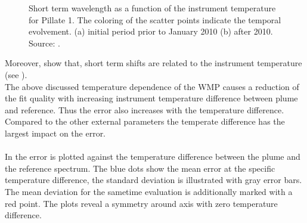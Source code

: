 \begin{figure}		
	\caption{Short term wavelength as a function of the instrument temperature for Pillate 1. The coloring of the scatter points indicate the temporal evolvement. (a) initial period prior to January 2010 (b) after 2010. Source: \cite{WarnachSimon}.}
	\label{fig:shorttermshift}
\end{figure}
Moreover, \cite{WarnachSimon} show that, short term shifts are related to the instrument temperature (see ).\\
The above discussed temperature dependence of the WMP causes a reduction of the fit quality with increasing instrument temperature difference between plume and reference. Thus the  error also increases with the temperature difference.
Compared to the other external parameters the temperate difference has the largest impact on the  error.\\
\\
In  the  error is plotted against the temperature difference between the plume and the reference spectrum. The blue dots show the mean  error at the specific temperature difference, the standard deviation is illustrated with gray error bars. The mean  deviation for the sametime evaluation is additionally marked with a red point. The plots reveal a symmetry around axis with zero temperature difference.
